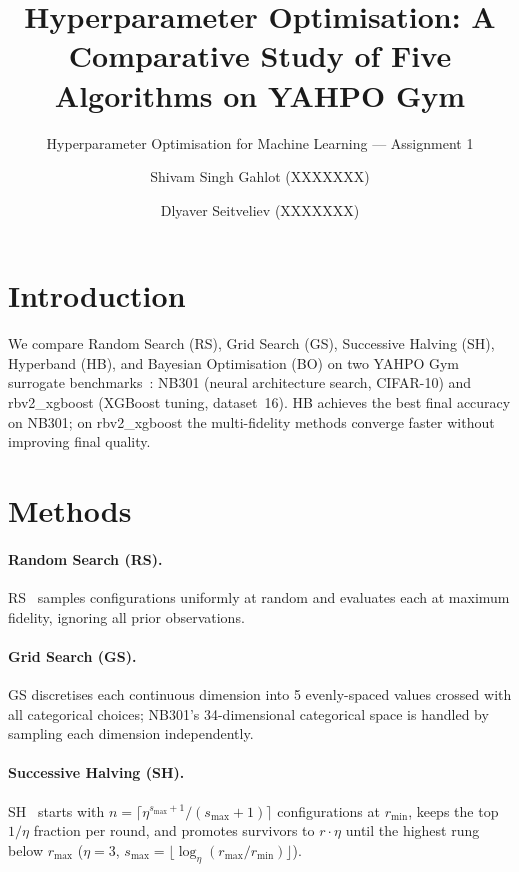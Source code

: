 \documentclass{AIM_report}
\title{Hyperparameter Optimisation: A Comparative Study of Five Algorithms on YAHPO Gym}
\subtitle{Hyperparameter Optimisation for Machine Learning --- Assignment 1}
\author{Shivam Singh Gahlot (XXXXXXX) \and Dlyaver Seitveliev (XXXXXXX)}
\institute{RWTH Aachen University, Germany\\
\email{\{shivam.gahlot, dlyaver.seitveliev\}@rwth-aachen.de}}
\begin{document}
\maketitle

\section{Introduction}

We compare Random Search (RS), Grid Search (GS), Successive Halving (SH),
Hyperband (HB), and Bayesian Optimisation (BO) on two YAHPO Gym surrogate
benchmarks~\cite{pfisterer2022yahpo}: NB301 (neural architecture search,
CIFAR-10) and rbv2\_xgboost (XGBoost tuning, dataset~16).
HB achieves the best final accuracy on NB301; on rbv2\_xgboost the
multi-fidelity methods converge faster without improving final quality.

\section{Methods}

\paragraph{Random Search (RS).}
RS~\cite{bergstra2012random} samples configurations uniformly at random
and evaluates each at maximum fidelity, ignoring all prior observations.

\paragraph{Grid Search (GS).}
GS discretises each continuous dimension into 5 evenly-spaced values
crossed with all categorical choices; NB301's 34-dimensional categorical
space is handled by sampling each dimension independently.

\paragraph{Successive Halving (SH).}
SH~\cite{jamieson2016non} starts with $n{=}\lceil\eta^{s_{\max}+1}/(s_{\max}+1)\rceil$
configurations at $r_{\min}$, keeps the top $1/\eta$ fraction per round,
and promotes survivors to $r \cdot\eta$ until the highest rung below
$r_{\max}$ ($\eta{=}3$, $s_{\max}{=}\lfloor\log_\eta(r_{\max}/r_{\min})\rfloor$).
\end{document}
